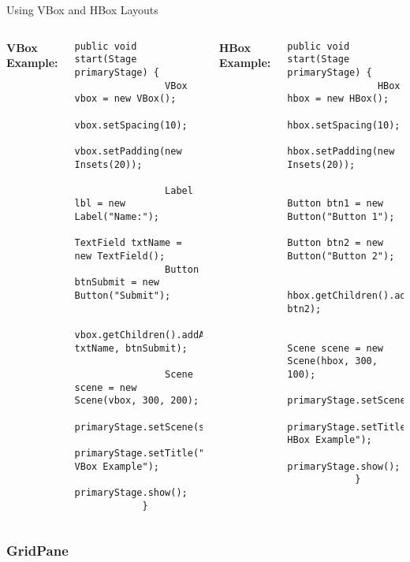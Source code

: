 \documentclass[aspectratio=169, table]{beamer}
\begin{document}
\begin{frame}[fragile]{Using VBox and HBox Layouts}
	\vspace{20pt}
	\begin{columns}[t]
		\textbf{VBox Example:}
		\begin{lstlisting}[style=JavaStyle]
			public void start(Stage primaryStage) {
				VBox vbox = new VBox();
				vbox.setSpacing(10);
				vbox.setPadding(new Insets(20));
				
				Label lbl = new Label("Name:");
				TextField txtName = new TextField();
				Button btnSubmit = new Button("Submit");
				
				vbox.getChildren().addAll(lbl, txtName, btnSubmit);
				
				Scene scene = new Scene(vbox, 300, 200);
				primaryStage.setScene(scene);
				primaryStage.setTitle("JavaFX VBox Example");
				primaryStage.show();
			}
		\end{lstlisting}
		
		\textbf{HBox Example:}
		\begin{lstlisting}[style=JavaStyle]
			public void start(Stage primaryStage) {
				HBox hbox = new HBox();
				hbox.setSpacing(10);
				hbox.setPadding(new Insets(20));
				
				Button btn1 = new Button("Button 1");
				Button btn2 = new Button("Button 2");
				
				hbox.getChildren().addAll(btn1, btn2);
				
				Scene scene = new Scene(hbox, 300, 100);
				primaryStage.setScene(scene);
				primaryStage.setTitle("JavaFX HBox Example");
				primaryStage.show();
			}
		\end{lstlisting}
	\end{columns}
\end{frame}



\subsubsection{GridPane}
\end{document}
